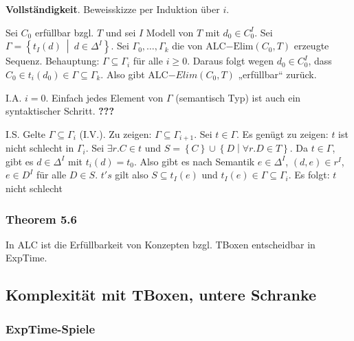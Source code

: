 \textbf{Vollständigkeit}. Beweisskizze per Induktion über $i$.

Sei $C_{0}$ erfüllbar bzgl. $T$ und sei $I$ Modell von $T$ mit
$d_{0} \in C_{0}^{I}$. Sei
$\Gamma = \left\{ t_{I}\left( d \right)\  \middle| \ d \in \Delta^{I} \right\}$.
Sei $\Gamma_{0},\ldots,\Gamma_{k}$ die von
$\text{ALC}\mathrm{-}\text{Elim}\left( C_{0},T \right)$ erzeugte
Sequenz. Behauptung: $\Gamma \subseteq \Gamma_{i}$ für alle
$i \geq 0$. Daraus folgt wegen $d_{0} \in C_{0}^{I}$, dass
$C_{0} \in t_{i}\left( d_{0} \right) \in \Gamma \subseteq \Gamma_{k}$.
Also gibt $\text{ALC}\mathrm{-}Elim(C_{0},T)$ „erfüllbar`` zurück.

I.A. $i = 0$. Einfach jedes Element von $\Gamma$ (semantisch Typ)
ist auch ein syntaktischer Schritt. \textbf{???}

I.S. Gelte $\Gamma \subseteq \Gamma_{i}$ (I.V.). Zu zeigen:
$\Gamma \subseteq \Gamma_{i + 1}$. Sei $t \in \Gamma$. Es genügt zu
zeigen: $t$ ist nicht schlecht in $\Gamma_{i}$. Sei
$\exists r.C \in t$ und
$S = \left\{ C \right\} \cup \left\{ D \middle| \forall r.D \in T \right\}$.
Da $t \in \Gamma$, gibt es $d \in \Delta^{I}$ mit
$t_{i}\left( d \right) = t_{0}$. Also gibt es nach Semantik
$e \in \Delta^{I}$, $\left( d,e \right) \in r^{I}$, $e \in D^{I}$
für alle $D \in S$. $t's$ gilt also
$S \subseteq t_{I}\left( e \right)$ und
$t_{I}\left( e \right) \in \Gamma \subseteq \Gamma_{i}$. Es folgt:
$t$ nicht schlecht

\hypertarget{theorem-5.6}{\subsubsection{Theorem
5.6}\label{theorem-5.6}}

In ALC ist die Erfüllbarkeit von Konzepten bzgl. TBoxen entscheidbar in
ExpTime.

\subsection{Komplexität mit TBoxen, untere
Schranke}\label{komplexituxe4t-mit-tboxen-untere-schranke}

\subsubsection{ExpTime-Spiele}\label{exptime-spiele}


